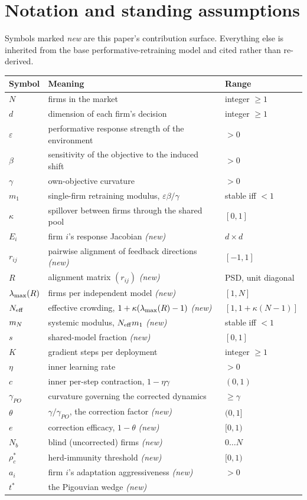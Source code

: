 \section{Notation and standing assumptions}
\label{app:notation}

Symbols marked \emph{new} are this paper's contribution surface. Everything else is inherited from the base performative-retraining model and cited rather than re-derived.

\begin{center}
\small
\begin{tabular}{lll}
\toprule
Symbol & Meaning & Range \\
\midrule
$N$ & firms in the market & integer $\geq 1$ \\
$d$ & dimension of each firm's decision & integer $\geq 1$ \\
$\varepsilon$ & performative response strength of the environment & $>0$ \\
$\beta$ & sensitivity of the objective to the induced shift & $>0$ \\
$\gamma$ & own-objective curvature & $>0$ \\
$m_1$ & single-firm retraining modulus, $\varepsilon\beta/\gamma$ & stable iff $<1$ \\
$\kappa$ & spillover between firms through the shared pool & $[0,1]$ \\
$E_i$ & firm $i$'s response Jacobian \emph{(new)} & $d \times d$ \\
$r_{ij}$ & pairwise alignment of feedback directions \emph{(new)} & $[-1,1]$ \\
$R$ & alignment matrix $(r_{ij})$ \emph{(new)} & PSD, unit diagonal \\
$\lambda_{\max}(R)$ & firms per independent model \emph{(new)} & $[1,N]$ \\
$N_{\mathrm{eff}}$ & effective crowding, $1+\kappa(\lambda_{\max}(R)-1)$ \emph{(new)} & $[1, 1+\kappa(N-1)]$ \\
$m_N$ & systemic modulus, $N_{\mathrm{eff}} m_1$ \emph{(new)} & stable iff $<1$ \\
$s$ & shared-model fraction \emph{(new)} & $[0,1]$ \\
$K$ & gradient steps per deployment & integer $\geq 1$ \\
$\eta$ & inner learning rate & $>0$ \\
$c$ & inner per-step contraction, $1-\eta\gamma$ & $(0,1)$ \\
$\gamma_{PO}$ & curvature governing the corrected dynamics & $\geq\gamma$ \\
$\theta$ & $\gamma/\gamma_{PO}$, the correction factor \emph{(new)} & $(0,1]$ \\
$e$ & correction efficacy, $1-\theta$ \emph{(new)} & $[0,1)$ \\
$N_b$ & blind (uncorrected) firms \emph{(new)} & $0 \ldots N$ \\
$\rho_c^\ast$ & herd-immunity threshold \emph{(new)} & $[0,1)$ \\
$a_i$ & firm $i$'s adaptation aggressiveness \emph{(new)} & $>0$ \\
$t^\ast$ & the Pigouvian wedge \emph{(new)} & \\
\bottomrule
\end{tabular}
\end{center}
